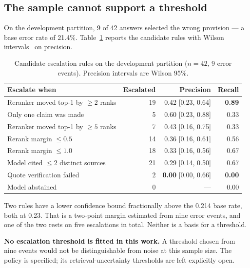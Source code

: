 \subsection{The sample cannot support a threshold}

On the development partition, 9 of 42 answers selected the wrong provision --- a
base error rate of 21.4\%. Table~\ref{tab:escalation} reports the candidate rules
with Wilson intervals~\cite{wilson1927probable} on precision.

\begin{table}[htbp]
  \centering
  \caption{Candidate escalation rules on the development partition ($n = 42$, 9 error events). Precision intervals are Wilson 95\%.}
  \label{tab:escalation}
  \begin{tabular}{lrrr}
    \toprule
    \textbf{Escalate when} & \textbf{Escalated} & \textbf{Precision} & \textbf{Recall} \\
    \midrule
    Reranker moved top-1 by $\geq 2$ ranks & 19 & 0.42 [0.23, 0.64] & \textbf{0.89} \\
    Only one claim was made & 5 & 0.60 [0.23, 0.88] & 0.33 \\
    Reranker moved top-1 by $\geq 5$ ranks & 7 & 0.43 [0.16, 0.75] & 0.33 \\
    Rerank margin $\leq 0.5$ & 14 & 0.36 [0.16, 0.61] & 0.56 \\
    Rerank margin $\leq 1.0$ & 18 & 0.33 [0.16, 0.56] & 0.67 \\
    Model cited $\leq 2$ distinct sources & 21 & 0.29 [0.14, 0.50] & 0.67 \\
    Quote verification failed & 2 & \textbf{0.00} [0.00, 0.66] & \textbf{0.00} \\
    Model abstained & 0 & --- & 0.00 \\
    \bottomrule
  \end{tabular}
\end{table}

Two rules have a lower confidence bound fractionally above the 0.214 base rate,
both at 0.23. That is a two-point margin estimated from nine error events, and one
of the two rests on five escalations in total. Neither is a basis for a threshold.

\textbf{No escalation threshold is fitted in this work.} A threshold chosen from nine events would not be distinguishable from noise at
this sample size. The policy is specified; its
retrieval-uncertainty thresholds are left explicitly open.


